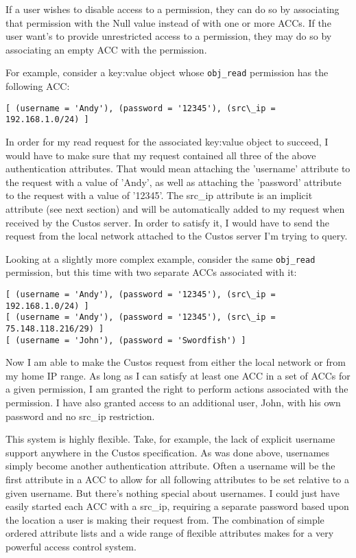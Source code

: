 If a user wishes to disable access to a permission, they can do so by
associating that permission with the Null value instead of with one or
more ACCs. If the user want's to provide unrestricted access to a
permission, they may do so by associating an empty ACC with the
permission.

For example, consider a key:value object whose \texttt{obj\_read}
permission has the following ACC:

\begin{Verbatim}[samepage=true]
[ (username = 'Andy'), (password = '12345'), (src\_ip = 192.168.1.0/24) ]
\end{Verbatim}

In order for my read request for the associated key:value object to
succeed, I would have to make sure that my request contained all three
of the above authentication attributes. That would mean attaching the
'username' attribute to the request with a value of 'Andy', as well as
attaching the 'password' attribute to the request with a value of
'12345'. The src\_ip attribute is an implicit attribute (see next
section) and will be automatically added to my request when received by
the Custos server. In order to satisfy it, I would have to send the
request from the local network attached to the Custos server I'm
trying to query.

Looking at a slightly more complex example, consider the same
\texttt{obj\_read} permission, but this time with two separate ACCs
associated with it:

\begin{Verbatim}[samepage=true]
[ (username = 'Andy'), (password = '12345'), (src\_ip = 192.168.1.0/24) ]
[ (username = 'Andy'), (password = '12345'), (src\_ip = 75.148.118.216/29) ]
[ (username = 'John'), (password = 'Swordfish') ]
\end{Verbatim}

Now I am able to make the Custos request from either the local network
or from my home IP range. As long as I can satisfy at least one ACC in
a set of ACCs for a given permission, I am granted the right to
perform actions associated with the permission. I have also granted
access to an additional user, John, with his own password and no
src\_ip restriction.

This system is highly flexible. Take, for example, the lack of
explicit username support anywhere in the Custos specification. As was
done above, usernames simply become another authentication
attribute. Often a username will be the first attribute in a ACC to
allow for all following attributes to be set relative to a given
username. But there's nothing special about usernames. I could just
have easily started each ACC with a src\_ip, requiring a separate
password based upon the location a user is making their request
from. The combination of simple ordered attribute lists and a wide
range of flexible attributes makes for a very powerful access control
system.

